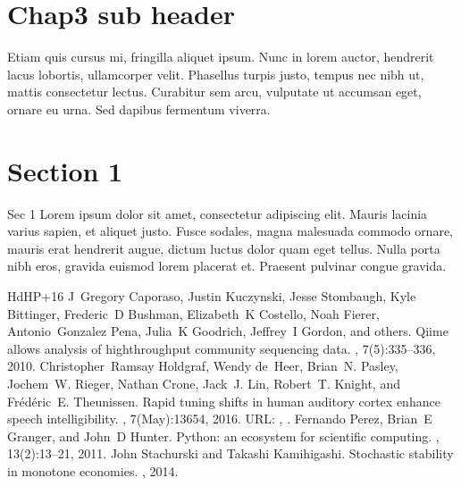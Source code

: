 \section{Chap3 sub header}
\label{\detokenize{part2/chap3:chap3-sub-header}}
\sphinxAtStartPar
Etiam quis cursus mi, fringilla aliquet ipsum. Nunc in lorem auctor, hendrerit lacus lobortis, ullamcorper velit. Phasellus turpis justo, tempus nec nibh ut, mattis consectetur lectus. Curabitur sem arcu, vulputate ut accumsan eget, ornare eu urna. Sed dapibus fermentum viverra.


\section{Section 1}
\label{\detokenize{part2/sec1:section-1}}\label{\detokenize{part2/sec1::doc}}
\sphinxAtStartPar
Sec 1 Lorem ipsum dolor sit amet, consectetur adipiscing elit. Mauris lacinia varius sapien, et aliquet justo. Fusce sodales, magna malesuada commodo ornare, mauris erat hendrerit augue, dictum luctus dolor quam eget tellus. Nulla porta nibh eros, gravida euismod lorem placerat et. Praesent pulvinar congue gravida.

\begin{sphinxthebibliography}{HdHP+16}
\sphinxAtStartPar
J Gregory Caporaso, Justin Kuczynski, Jesse Stombaugh, Kyle Bittinger, Frederic D Bushman, Elizabeth K Costello, Noah Fierer, Antonio Gonzalez Pena, Julia K Goodrich, Jeffrey I Gordon, and others. Qiime allows analysis of high\sphinxhyphen{}throughput community sequencing data. , 7(5):335–336, 2010.
\sphinxAtStartPar
Christopher Ramsay Holdgraf, Wendy de Heer, Brian N. Pasley, Jochem W. Rieger, Nathan Crone, Jack J. Lin, Robert T. Knight, and Frédéric E. Theunissen. Rapid tuning shifts in human auditory cortex enhance speech intelligibility. , 7(May):13654, 2016. URL: , .
\sphinxAtStartPar
Fernando Perez, Brian E Granger, and John D Hunter. Python: an ecosystem for scientific computing. , 13(2):13–21, 2011.
\sphinxAtStartPar
John Stachurski and Takashi Kamihigashi. Stochastic stability in monotone economies. , 2014.
\end{sphinxthebibliography}







\renewcommand{\indexname}{Index}
\printindex
